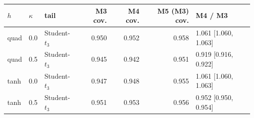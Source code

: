 \begin{tabular}{lllrrrl}
\toprule
$h$ & $\kappa$ & tail & M3 cov. & M4 cov. & M5 (M3) cov. & M4 / M3 \\
\midrule
quad & 0.0 & Student-$t_3$ & 0.950 & 0.952 & 0.958 & 1.061 [1.060, 1.063] \\
quad & 0.5 & Student-$t_3$ & 0.945 & 0.942 & 0.951 & 0.919 [0.916, 0.922] \\
tanh & 0.0 & Student-$t_3$ & 0.947 & 0.948 & 0.955 & 1.061 [1.060, 1.063] \\
tanh & 0.5 & Student-$t_3$ & 0.951 & 0.953 & 0.956 & 0.952 [0.950, 0.954] \\
\bottomrule
\end{tabular}
